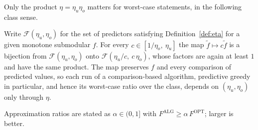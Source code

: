 Only the product $\eta=\eta_u\eta_o$ matters for worst-case statements, in
the following class sense.
\begin{lemma}[Scaling]\label{lem:scaling}
Write $\mathcal F(\eta_u,\eta_o)$ for the set of predictors satisfying
Definition~\ref{def:eta} for a given monotone submodular $f$.  For every
$c\in[1/\eta_o,\ \eta_u]$ the map $\tilde f\mapsto c\tilde f$ is a bijection
from $\mathcal F(\eta_u,\eta_o)$ onto $\mathcal F(\eta_u/c,\ c\,\eta_o)$,
whose factors are again at least $1$ and have the same product.  The map
preserves $f$ and every comparison of predicted values, so each run of a
comparison-based algorithm, predictive greedy in particular, and hence its
worst-case ratio over the class, depends on $(\eta_u,\eta_o)$ only through
$\eta$.
\end{lemma}

Approximation ratios are stated as $\alpha\in(0,1]$ with
$F^{\mathrm{ALG}}\ge\alpha\,F^{\mathrm{OPT}}$; larger is better.

